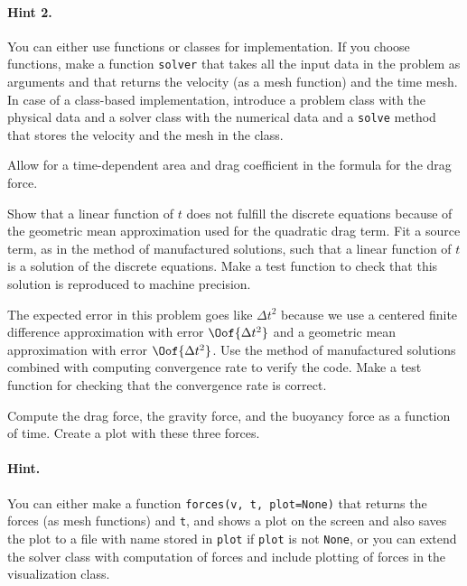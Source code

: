 \documentclass[graybox,sectrefs,envcountresetchap,open=right,final]{svmonodo}
\newenvironment{doconceexercise}{}{}
\begin{document}
\begin{doconceexercise}


\paragraph{Hint 2.}
You can either use functions or classes for implementation.
If you choose functions, make a function
\texttt{solver} that takes all the input data in the problem as
arguments and that returns the velocity (as a mesh function) and
the time mesh. In case of a class-based implementation, introduce
a problem class with the physical data
and a solver class with the numerical data and a \texttt{solve} method
that stores the velocity and the mesh in the class.

Allow for a time-dependent area and drag coefficient in the
formula for the drag force.


Show that a linear function of $t$ does not fulfill the discrete
equations because of the geometric mean approximation
used for the quadratic drag
term.  Fit a source term, as in the method of manufactured solutions,
such that a linear function of $t$ is a solution of the discrete
equations. Make a test function to check that this solution is reproduced
to machine precision.

The expected error in this problem goes like $\Delta t^2$ because we
use a centered finite difference approximation with error $\Oof{\Delta t^2}$
and a geometric mean approximation with error $\Oof{\Delta t^2}$.
Use the method of manufactured solutions combined with computing
convergence rate to verify the code. Make a test function for checking
that the convergence rate is correct.

Compute the drag force, the gravity
force, and the buoyancy force as a function of time. Create
a plot with these three forces.


\paragraph{Hint.}
You can either make a function \texttt{forces(v, t, plot=None)}
that returns the forces (as mesh functions) and \texttt{t}, and shows
a plot on the screen and also saves the plot to a file with name
stored in \texttt{plot}
if \texttt{plot} is not \texttt{None}, or you can extend the solver class with
computation of forces and include plotting of forces in the
visualization class.


\end{doconceexercise}
\end{document}
